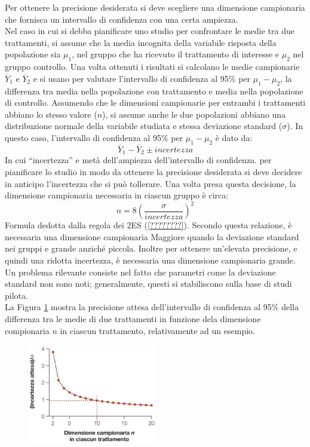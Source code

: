\documentclass[10pt, draft]{book}
\begin{document}
Per ottenere la precisione desiderata si deve scegliere una dimensione campionaria che fornisca un intervallo di confidenza con una certa ampiezza.\\
Nel caso in cui si debba pianificare uno studio per confrontare le medie tra due trattamenti, si assume che la media incognita della variabile risposta della popolazione sia $\mu_1$, nel gruppo che ha ricevuto il trattamento di interesse e $\mu_2$ nel gruppo controllo. Una volta ottenuti i risultati si calcolano le medie campionarie $\overline{Y}_1$ e $\overline{Y}_2$ e si usano per valutare l'intervallo di confidenza al 95\% per $\mu_1 - \mu_2$, la differenza tra media nella popolazione con trattamento e media nella popolazione di controllo. Assumendo che le dimensioni campionarie per entrambi i trattamenti abbiano lo stesso valore ($n$), si assume anche le due popolazioni abbiano una distribuzione normale della variabile studiata e stessa deviazione standard ($\sigma$). In questo caso, l'intervallo di confidenza al 95\% per $\mu_1 - \mu_2$ è dato da:
\begin{equation}
    \overline{Y}_1 - \overline{Y}_2 \pm incertezza
\end{equation}
In cui ``incertezza'' e metà dell'ampiezza dell'intervallo di confidenza. per pianificare lo studio in modo da ottenere la precisione desiderata si deve decidere in anticipo l'incertezza che si può tollerare. Una volta presa questa decisione, la dimensione campionaria necessaria in ciascun gruppo è circa:
\begin{equation}
    n = 8 \left(\frac{\sigma}{incertezza}\right)^2   
\end{equation}
Formula dedotta dalla regola dei 2ES (\ref{????????}). Secondo questa relazione, è necessaria una dimensione campionaria Maggiore quando la deviazione standard nei gruppi e grande anziché piccola. Inoltre per ottenere un'elevata precisione, e quindi una ridotta incertezza, è necessaria una dimensione campionaria grande.\\
Un problema rilevante consiste nel fatto che parametri come la deviazione standard non sono noti; generalmente, questi si stabiliscono sulla base di studi pilota.\\
La Figura \ref{fig14.7-1} mostra la precisione attesa dell'intervallo di confidenza al 95\% della differenza tra le medie di due trattamenti in funzione dela dimensione compionaria $n$ in ciascun trattamento, relativamente ad un esempio.
\begin{figure}[H]
    \centering
    \includegraphics[width=0.5\textwidth]{fig14.7-1}
    \caption{\small{}}
    \label{fig14.7-1}
\end{figure}
\end{document}
